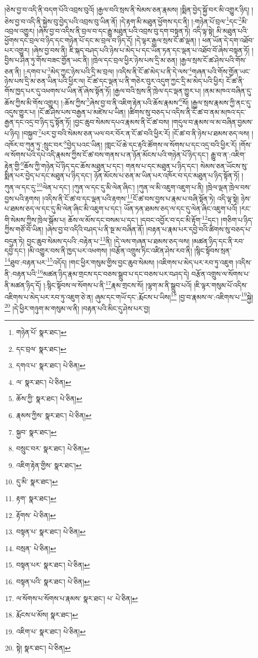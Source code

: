 །ཅེས་བྱ་བ་འདི་ནི་བདག་པོའི་འབྲས་བུའོ། །རྒྱལ་བའི་སྲས་ནི་སེམས་ཅན་རྣམས། །སྨིན་བྱེད་སྐྱོ་བར་མི་འགྱུར་ཉིད། །ཅེས་བྱ་བ་འདི་ནི་སྐྱེས་བུ་བྱེད་པའི་འབྲས་བུ་ཡིན་ནོ། །དེ་རྟག་མི་མཐུན་ཕྱོགས་དང་ནི། །:གཉེན་པོ་བྲལ་\footnote{གཉེན་པོ་  སྣར་ཐང་། }དང་\footnote{དང་བྲལ་  སྣར་ཐང་། }མི་འབྲལ་འགྱུར། །ཞེས་བྱ་བ་འདིས་ནི་བྲལ་བ་དང་རྒྱུ་མཐུན་པའི་འབྲས་བུ་དག་བསྟན་ཏེ། འདི་ལྟ་སྟེ། མི་མཐུན་པའི་ཕྱོགས་དང་བྲལ་བ་ཉིད་དང་གཉེན་པོ་དང་མ་བྲལ་བ་ཉིད་དོ། །དེ་ལྟར་རྒྱལ་སྲས་ངོ་ཚ་ལྡན། །
ཕན་ཡོན་དེ་དག་འཐོབ་པར་འགྱུར། །ཞེས་བྱ་བས་ནི། ཇི་སྐད་བཤད་པའི་ཉེས་པ་མེད་པ་དང་ཡོན་ཏན་དང་ལྡན་པ་འཐོབ་བོ་ཞེས་བསྟན་ཏོ། །བྱིས་པ་ཤིན་ཏུ་གོས་བཟང་གྱོན་ཡང་ནི། །ཁྲེལ་དང་བྲལ་ཕྱིར་ཉེས་པས་དྲི་མ་ཅན། །རྒྱལ་སྲས་ངོ་ཚ་ཤེས་པའི་གོས་ཅན་ནི། །:དགབ་པ་\footnote{དགའ་པ་  སྣར་ཐང་།  པེ་ཅིན། }མེད་ཀྱང་ཉེས་པའི་དྲི་མ་བྲལ། །འདིས་ནི་ངོ་ཚ་མེད་པ་ནི་དེ་ལས་\footnote{ལ་  སྣར་ཐང་།  པེ་ཅིན། }གཞན་པའི་གོས་གྱོན་ཡང་ཉེས་པས་དྲི་མ་ཅན་ཡིན་པའི་ཕྱིར་ལ། ངོ་ཚ་དང་ལྡན་པ་ནི་གཅེར་བུར་འདུག་ཀྱང་དྲི་མ་མེད་པའི་ཕྱིར། ངོ་ཚ་ནི་གོས་ཁྱད་པར་དུ་འཕགས་པ་ཡིན་ནོ་ཞེས་སྟོན་ཏོ། །རྒྱལ་བའི་སྲས་ནི་ཁྲེལ་དང་ལྡན་གྱུར་པ། །ནམ་མཁའ་བཞིན་དུ་ཆོས་ཀྱིས་མི་གོས་འགྱུར། །:ཆོས་ཀྱིས་\footnote{ཆོས་ཀྱི་  སྣར་ཐང་།  པེ་ཅིན། }ཞེས་བྱ་བ་ནི་འཇིག་རྟེན་པའི་ཆོས་རྣམས་\footnote{རྣམས་ཀྱིས་  སྣར་ཐང་།  པེ་ཅིན། }སོ། །རྒྱལ་སྲས་རྣམས་ཀྱི་ནང་དུ་འདུས་གྱུར་པ། །ངོ་ཚ་ཤེས་པས་བརྒྱན་པ་མཛེས་པ་ཡིན། །ཚིགས་སུ་བཅད་པ་འདིས་ནི་ངོ་ཚ་བ་ནམ་མཁའ་དང་རྒྱན་དང་འདྲ་བ་ཉིད་དུ་སྟོན་ཏོ། །བྱང་ཆུབ་སེམས་དཔའ་རྣམས་ནི་ངོ་ཚ་བས། །གདུལ་བ་རྣམས་ལ་མ་བཞིན་བྱམས་པ་ཉིད། །བསྐྱབ་\footnote{སྐྱབ་  སྣར་ཐང་། }པར་བྱ་བའི་སེམས་ཅན་ཡལ་བར་བོར་ན་ངོ་ཚ་བའི་ཕྱིར་རོ། །ངོ་ཚ་བ་ནི་ཉེས་པ་ཐམས་ཅད་ལས། །འཁོར་བ་ཀུན་ཏུ་:སྲུང་བར་\footnote{བསྲུང་བར་  སྣར་ཐང་།  པེ་ཅིན། }བྱེད་པའང་ཡིན། །གླང་པོ་ཆེ་དང་རྟའི་ཚོགས་ལ་སོགས་པ་དང་འདྲ་བའི་ཕྱིར་རོ། །གོས་ལ་སོགས་པའི་དཔེ་འདི་རྣམས་ཀྱིས་ངོ་ཚ་བས་གནས་པ་ན་ཉོན་མོངས་པའི་གཉེན་པོ་ཉིད་དང་། རྒྱུ་བ་ན་:འཇིག་རྟེན་གྱི་\footnote{འཇིག་རྟེན་གྱིས་  སྣར་ཐང་། }ཆོས་ཀྱི་གཉེན་པོ་ཉིད་དང་ཆོས་མཐུན་པ་དང་། གནས་པ་དང་མཐུན་པ་ཉིད་དང་། སེམས་ཅན་ཡོངས་སུ་སྨིན་པར་བྱེད་པ་དང་མཐུན་པ་ཉིད་དང་། ཉོན་མོངས་པ་ཅན་མ་ཡིན་པར་འཁོར་བ་དང་མཐུན་པ་ཉིད་སྟོན་ཏོ། །ཀུན་ལ་དང་དུ་\footnote{དུ་མི་  སྣར་ཐང་། }ལེན་པ་དང་། །ཀུན་ལ་དང་དུ་མི་ལེན་ཞིང་། །ཀུན་ལ་མི་འཇུག་འཇུག་པ་ནི། །ཁྲེལ་ལྡན་ཁྲེལ་བས་བྱས་པའི་རྟགས། །འདིས་ནི་ངོ་ཚ་བ་དང་ལྡན་པའི་རྟགས་\footnote{རྟག་  སྣར་ཐང་། }ངོ་ཚ་བས་བྱས་པ་རྣམ་པ་བཞི་སྟོན་ཏེ། འདི་ལྟ་སྟེ། ཉེས་པ་ཐམས་ཅད་ལ་དང་དུ་མི་ལེན་ཞིང་མི་འཇུག་པ་དང་། ཡོན་ཏན་ཐམས་ཅད་ལ་དང་དུ་ལེན་ཞིང་འཇུག་པའོ། །རང་གི་སེམས་ཀྱིས་ཁྲེལ་སྒོམ་པ། ཆོས་ལ་མོས་དང་བསམ་པ་དང་། །དབང་འབྱོར་བ་དང་མི་རྟོག་\footnote{རྟོགས་  པེ་ཅིན། }དང་། །གཅིག་པ་ཉིད་ཀྱིས་གཙོ་བོ་ཡིན། །ཞེས་བྱ་བ་འདིའི་བཤད་པ་ནི་སྔ་མ་བཞིན་ནོ། །བརྟན་པ་རྣམ་པར་དབྱེ་བའི་ཚིགས་སུ་བཅད་པ་བདུན་ཏེ། བྱང་ཆུབ་སེམས་དཔའི་:བརྟེན་པ་\footnote{བསྟན་པ་  སྣར་ཐང་།  པེ་ཅིན། }ནི། །དེ་ལས་གཞན་པ་ཐམས་ཅད་ལས། །མཚན་ཉིད་དང་ནི་རབ་དབྱེ་དང་། །མི་འགྱུར་བས་ནི་ཁྱད་པར་འཕགས། །བརྩོན་འགྲུས་ཏིང་འཛིན་ཤེས་རབ་ནི། །སྙིང་སྟོབས་སྲན་\footnote{བསྲན་  པེ་ཅིན། }ཐུབ་:བརྟན་པར་\footnote{བསྟན་པར་  སྣར་ཐང་།  པེ་ཅིན། }འདོད། །གང་ཕྱིར་གསུམ་གྱིས་བྱང་ཆུབ་སེམས། །འཇིགས་པ་མེད་པར་རབ་ཏུ་འཇུག །འདིས་ནི་:བརྟན་པའི་\footnote{བསྟན་པའི་  སྣར་ཐང་།  པེ་ཅིན། }མཚན་ཉིད་རྣམ་གྲངས་དང་བཅས་སྒྲུབ་པ་དང་བཅས་པར་བཤད་དེ། བརྩོན་འགྲུས་ལ་སོགས་པ་ནི་མཚན་ཉིད་དོ། །:སྙིང་སྟོབས་ལ་སོགས་པ་ནི་\footnote{ལ་སོགས་པ་སོགས་པ་རྣམས་  སྣར་ཐང་། པ་  པེ་ཅིན། }རྣམ་གྲངས་སོ། །ལྷག་མ་ནི་སྒྲུབ་པའོ། །ཇི་ལྟར་གསུམ་པོ་འདིས་འཇིགས་པ་མེད་པར་རབ་ཏུ་འཇུག་ཅེ་ན། ཞུམ་དང་གཡོ་དང་:རྨོངས་པ་ཡིས།\footnote{རྨོངས་པ་མོས།  སྣར་ཐང་། } །བྱ་བ་རྣམས་ལ་:འཇིགས་པ་\footnote{འཇིག་པ་  སྣར་ཐང་།  པེ་ཅིན། }སྐྱེ།\footnote{སྟེ།  སྣར་ཐང་།  པེ་ཅིན། } །དེ་ཕྱིར་གཉུག་མ་གསུམ་ལ་ནི། །བརྟན་པའི་མིང་དུ་ཤེས་པར་བྱ། 